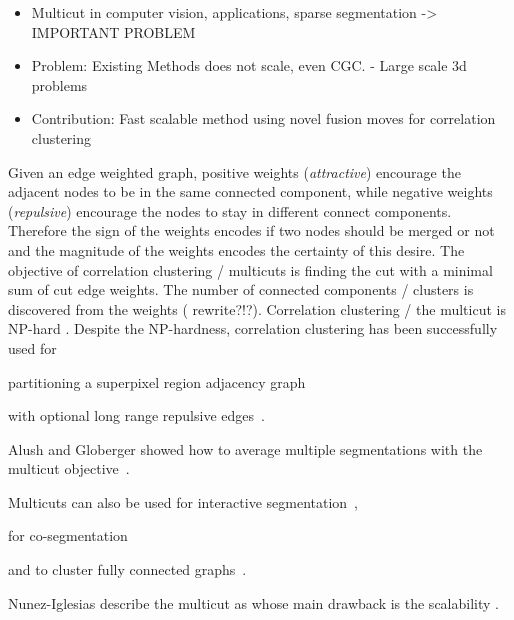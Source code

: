 \documentclass[10pt,twocolumn,letterpaper]{article}
\begin{document}
\begin{itemize}
  \item Multicut in computer vision, applications, sparse segmentation -> IMPORTANT PROBLEM
  \item Problem: Existing Methods does not scale, even CGC. - Large scale 3d problems
  \item Contribution: Fast scalable method using novel fusion moves for correlation clustering
\end{itemize}





Given an edge weighted graph, positive weights (\emph{attractive})
encourage the adjacent nodes to be in the same 
connected component, while negative weights (\emph{repulsive}) encourage
the nodes to stay in different connect components.
Therefore the sign of the weights encodes if two
nodes should be merged or not and the magnitude of the weights encodes
the certainty of this desire.
The objective of correlation clustering / multicuts
is finding the cut with a minimal sum of cut edge weights.
The number of connected components / clusters is discovered
from the weights ( rewrite?!?).
Correlation clustering / the multicut is NP-hard \cite{???}.
%
Despite the NP-hardness, correlation clustering has been 
successfully used for
\begin{inparaenum}[(i)]
    \item partitioning a superpixel region adjacency graph~\cite{andres_2011_iccv,kroeger_2012_eccv}
    \item with optional long range repulsive edges~\cite{andres_2013_emmcvpr}.
    \item Alush and Globerger showed how to average multiple segmentations with the multicut objective~\cite{alush_2012_pami}.
    \item Multicuts can also be used for interactive segmentation~\cite{bagon_2011_arxiv},
    \item for co-segmentation~\cite{glassner_2011_cvpr}
    \item and to cluster fully connected graphs~\cite{???}.
\end{inparaenum}







Nunez-Iglesias \etal describe the multicut as
 whose 
main drawback is the scalability \cite{nunez_iglesias_2013}.
\end{document}
